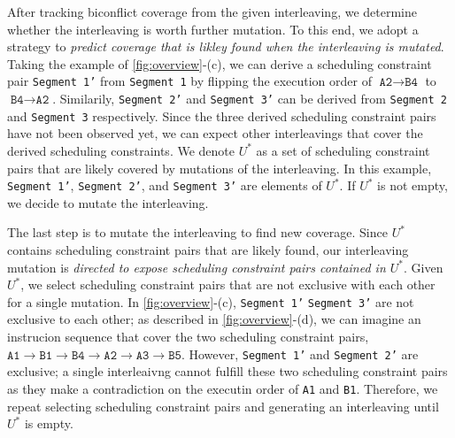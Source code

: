 %
After tracking biconflict coverage from the given interleaving, we
determine whether the interleaving is worth further mutation.
%
To this end, we adopt a strategy to \textit{predict coverage that is
  likley found when the interleaving is mutated}.
%
Taking the example of \autoref{fig:overview}-(c), we can derive a
scheduling constraint pair \texttt{Segment 1'} from \texttt{Segment 1}
by flipping the execution order of
$\texttt{A2} \rightarrow \texttt{B4}$ to
$\texttt{B4} \rightarrow \texttt{A2}$.
%
Similarily, \texttt{Segment 2'} and \texttt{Segment 3'} can be derived
from \texttt{Segment 2} and \texttt{Segment 3} respectively.
%
Since the three derived scheduling constraint pairs have not been
observed yet, we can expect other interleavings that cover the derived
scheduling constraints.
%
We denote $U^*$ as a set of scheduling constraint pairs that are
likely covered by mutations of the interleaving. In this example,
\texttt{Segment 1'}, \texttt{Segment 2'}, and \texttt{Segment 3'} are
elements of $U^*$.
If $U^*$ is not empty, we decide to mutate the interleaving. 


The last step is to mutate the interleaving to find new
coverage. Since $U^*$ contains scheduling constraint pairs that are
likely found, our interleaving mutation is \textit{directed to expose
  scheduling constraint pairs contained in $U^*$}.
%
Given $U^*$, we select scheduling constraint pairs that are not
exclusive with each other for a single mutation.
%
In \autoref{fig:overview}-(c), \texttt{Segment 1'} \texttt{Segment 3'}
are not exclusive to each other; as described in
\autoref{fig:overview}-(d), we can imagine an instrucion sequence that
cover the two scheduling constraint pairs,
$\texttt{A1} \rightarrow \texttt{B1} \rightarrow \texttt{B4}
\rightarrow \texttt{A2} \rightarrow \texttt{A3} \rightarrow
\texttt{B5}$.
%
However, \texttt{Segment 1'} and \texttt{Segment 2'} are exclusive; a
single interleaivng cannot fulfill these two scheduling constraint
pairs as they make a contradiction on the executin order of
\texttt{A1} and \texttt{B1}.
%
Therefore, we repeat selecting scheduling constraint pairs and
generating an interleaving until $U^*$ is empty.











